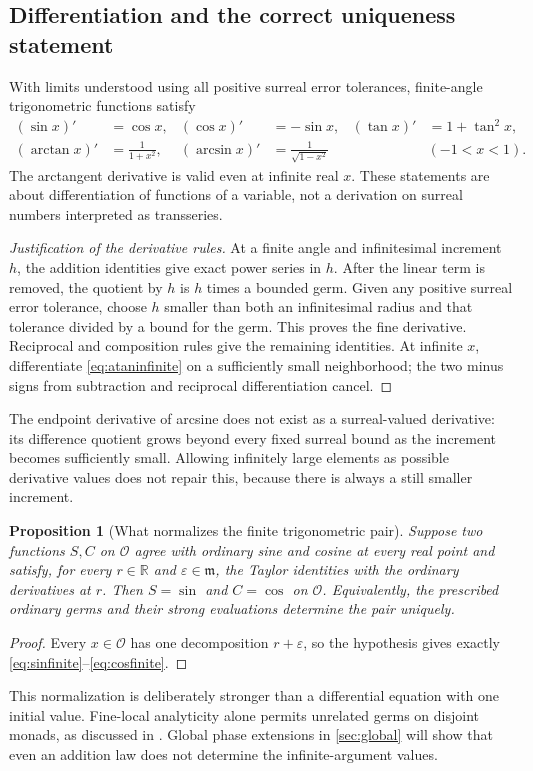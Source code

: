 \documentclass[11pt,letterpaper]{article}
\newtheorem{proposition}[theorem]{Proposition}
\theoremstyle{definition}
\theoremstyle{remark}
\newcommand{\R}{\mathbb R}\newcommand{\C}{\mathbb C}
\newcommand{\OO}{\mathcal O}\newcommand{\mm}{\mathfrak m}
\newcommand{\arcs}{\operatorname{arcsin}}
\newcommand{\arct}{\operatorname{arctan}}
\numberwithin{equation}{section}
\begin{document}
\subsection{Differentiation and the correct uniqueness statement}
With limits understood using all positive surreal error tolerances, finite-angle trigonometric functions satisfy
\begin{align*}
 (\sin x)'&=\cos x,& (\cos x)'&=-\sin x,& (\tan x)'&=1+\tan^2x,\\
 (\arct x)'&=\frac1{1+x^2},&
 (\arcs x)'&=\frac1{\sqrt{1-x^2}}&&(-1<x<1).
\end{align*}
The arctangent derivative is valid even at infinite real $x$. These statements are about differentiation of functions of a variable, not a derivation on surreal numbers interpreted as transseries.

\begin{proof}[Justification of the derivative rules]
At a finite angle and infinitesimal increment $h$, the addition identities give exact power series in $h$. After the linear term is removed, the quotient by $h$ is $h$ times a bounded germ. Given any positive surreal error tolerance, choose $h$ smaller than both an infinitesimal radius and that tolerance divided by a bound for the germ. This proves the fine derivative. Reciprocal and composition rules give the remaining identities. At infinite $x$, differentiate \eqref{eq:ataninfinite} on a sufficiently small neighborhood; the two minus signs from subtraction and reciprocal differentiation cancel.
\end{proof}

The endpoint derivative of arcsine does not exist as a surreal-valued derivative: its difference quotient grows beyond every fixed surreal bound as the increment becomes sufficiently small. Allowing infinitely large elements as possible derivative values does not repair this, because there is always a still smaller increment.

\begin{proposition}[What normalizes the finite trigonometric pair]\label{prop:normalization}
Suppose two functions $S,C$ on $\OO$ agree with ordinary sine and cosine at every real point and satisfy, for every $r\in\R$ and $\varepsilon\in\mm$, the Taylor identities with the ordinary derivatives at $r$. Then $S=\sin$ and $C=\cos$ on $\OO$. Equivalently, the prescribed ordinary germs and their strong evaluations determine the pair uniquely.
\end{proposition}
\begin{proof}
Every $x\in\OO$ has one decomposition $r+\varepsilon$, so the hypothesis gives exactly \eqref{eq:sinfinite}--\eqref{eq:cosfinite}.
\end{proof}
This normalization is deliberately stronger than a differential equation with one initial value. Fine-local analyticity alone permits unrelated germs on disjoint monads, as discussed in \cite{SourceAnalysis}. Global phase extensions in \cref{sec:global} will show that even an addition law does not determine the infinite-argument values.
\end{document}
